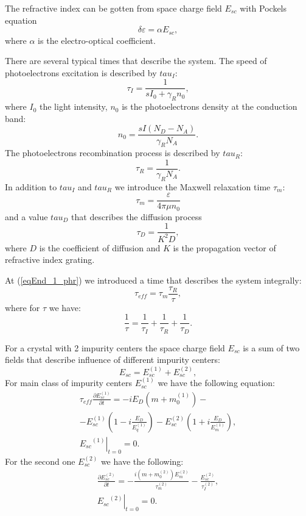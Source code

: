 The refractive index can be gotten from space charge field $E_{sc}$ 
with Pockels equation
\begin{equation}
\delta \varepsilon = \alpha E_{sc},
\label{eqElectroOpt_phr}
\end{equation}
where $\alpha$ is the electro-optical coefficient.

There are several typical times that describe the system. The speed of
photoelectrons excitation is described by $tau_I$:
\[
\tau_I = \frac{1}{s I_0 + \gamma_R n_0},
\]
where $I_0$ the light intensity, $n_0$ is the photoelectrons
density at the conduction band:
\[
n_0 = \frac{s I (N_D - N_A)}{\gamma_R N_A}.
\]
The photoelectrons recombination process is described by $tau_R$:
\[
\tau_R = \frac{1}{\gamma_R N_A}.
\]
In addition to $tau_I$ and $tau_R$ we introduce the Maxwell relaxation
time $\tau_m$: 
\[
\tau_m = \frac{\varepsilon}{4 \pi \mu n_0}
\]
and a value $tau_D$ that describes the diffusion process 
\[
\tau_D = \frac{1}{K^2 D},
\]
where $D$ is the coefficient of diffusion and $K$ is the propagation
vector of refractive index grating. 

At (\ref{eqEnd_1_phr}) we introduced a time that describes the system
integrally:
\[
\tau_{eff} = \tau_m \frac{\tau_R}{\tau},
\]
where for $\tau$ we have:
\[
\frac{1}{\tau} = \frac{1}{\tau_I} + \frac{1}{\tau_R} + \frac{1}{\tau_D}.
\]

For a crystal with 2 impurity centers the space charge field $E_{sc}$
is a sum of two fields that describe influence of different impurity
centers: 
\[
E_{sc} =  E_{sc}^{(1)} + E_{sc}^{(2)},
\]
For main class of impurity centers $E_{sc}^{(1)}$ we have the following
equation:  
\begin{eqnarray}
\label{eqEsc_1_End_2_phr}
\tau_{eff} 
\frac {\partial E_{sc}^{(1)}} {\partial t} =
- i E_D \left(m + m_0^{(1)}\right) 
- \nonumber \\ 
- E_{sc}^{(1)} 
\left( 1 - i \frac{E_D}{E_q^{(1)}} \right)
 -  E_{sc}^{(2)} 
\left( 1+ i \frac{E_D}{E_m^{(1)}} 
\right),
\nonumber \\ 
\left. {E_{sc}}^{(1)} \right|_{t=0} = 0.
\end{eqnarray}
For the second one $E_{sc}^{(2)}$ we have the following:
\begin{eqnarray}
\label{eqEsc_2_End_2_phr}
\frac {\partial E_{sc}^{(2)}} {\partial t} =
- \frac{i \left( m+ m_0^{(2)} \right) E_m^{(2)}}{\tau_m^{(2)}}
- \frac{E_{sc}^{(2)}}{\tau_I^{(2)}},
\nonumber \\ 
\left. {E_{sc}}^{(2)} \right|_{t=0} = 0.
\end{eqnarray}

